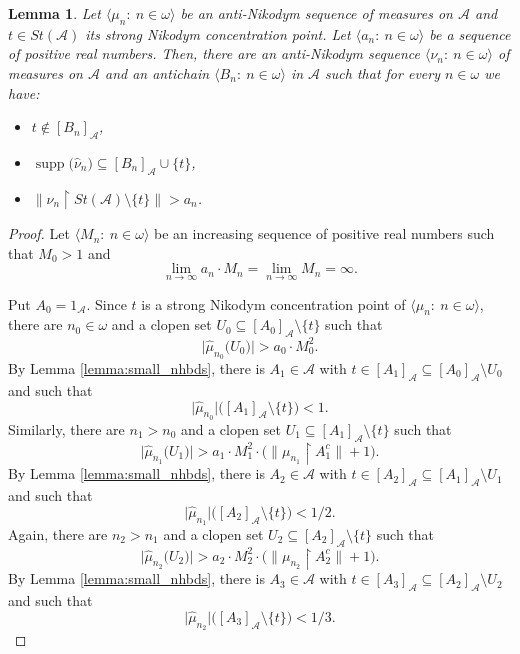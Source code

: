 \documentclass[a4paper,11pt,fleqn]{amsart}
\newtheorem{lemma}[theorem]{Lemma}
\theoremstyle{definition}
\theoremstyle{remark}
\numberwithin{equation}{section}
\newcommand{\N}{\mathbb{N}}
\newcommand{\aA}{\mathcal{A}}
\newcommand{\rstr}{\restriction}
\newcommand{\sm}{\setminus}
\newcommand{\sub}{\subseteq}
\DeclareMathOperator{\supp}{supp}
\newcommand{\wh}{\widehat}
\newcommand{\seqn}[1]{\big\langle#1\colon\ n\io\big\rangle}
\newcommand{\clopen}[1]{\left[#1\right]}
\newcommand{\io}{\in\omega}%
\begin{document}
\begin{lemma}\label{lemma:aN_disjointification}
Let $\seqn{\mu_n}$ be an anti-Nikodym sequence of measures on $\aA$ and $t\in St(\aA)$ its strong Nikodym concentration point. Let $\seqn{a_n}$ be a sequence of positive real numbers. Then, there are an anti-Nikodym sequence $\seqn{\nu_n}$ of measures on $\aA$ and an antichain $\seqn{B_n}$ in $\aA$ such that for every $n\io$ we have:
\begin{itemize}
	\item $t\not\in\clopen{B_n}_\aA$,
	\item $\supp\big(\wh{\nu}_n\big)\sub\clopen{B_n}_\aA\cup\{t\}$,
	\item $\big\|\wh{\nu}_n\rstr St(\aA)\sm\{t\}\big\|>a_n$.
\end{itemize}
\end{lemma}
\begin{proof}
Let $\seqn{M_n}$ be an increasing sequence of positive real numbers such that $M_0>1$ and
\[\tag{$*$}\lim_{n\to\infty}a_n\cdot M_n=\lim_{n\to\infty}M_n=\infty.\]

Put $A_0=1_\aA$. Since $t$ is a strong Nikodym concentration point of $\seqn{\mu_n}$, there are $n_0\io$ and a clopen set $U_0\sub\clopen{A_0}_\aA\sm\{t\}$ such that
\[\big|\wh{\mu}_{n_0}\big(U_0\big)\big|>a_0\cdot M_0^2.\]
By Lemma \ref{lemma:small_nhbds}, there is $A_1\in\aA$ with $t\in\clopen{A_1}_\aA\sub\clopen{A_0}_\aA\sm U_0$ and such that
\[\big|\wh{\mu}_{n_0}\big|\big(\clopen{A_1}_\aA\sm\{t\}\big)<1.\]
Similarly, there are $n_1>n_0$ and a clopen set $U_1\sub\clopen{A_1}_\aA\sm\{t\}$ such that
\[\big|\wh{\mu}_{n_1}\big(U_1\big)\big|>a_1\cdot M_1^2\cdot\Big(\big\|\mu_{n_1}\rstr A_1^c\big\|+1\Big).\]
By Lemma \ref{lemma:small_nhbds}, there is $A_2\in\aA$ with $t\in\clopen{A_2}_\aA\sub\clopen{A_1}_\aA\sm U_1$ and such that
\[\big|\wh{\mu}_{n_1}\big|\big(\clopen{A_2}_\aA\sm\{t\}\big)<1/2.\]
Again, there are $n_2>n_1$ and a clopen set $U_2\sub\clopen{A_2}_\aA\sm\{t\}$ such that
\[\big|\wh{\mu}_{n_2}\big(U_2\big)\big|>a_2\cdot M_2^2\cdot\Big(\big\|\mu_{n_2}\rstr A_2^c\big\|+1\Big).\]
By Lemma \ref{lemma:small_nhbds}, there is $A_3\in\aA$ with $t\in\clopen{A_3}_\aA\sub\clopen{A_2}_\aA\sm U_2$ and such that
\[\big|\wh{\mu}_{n_2}\big|\big(\clopen{A_3}_\aA\sm\{t\}\big)<1/3.\]


\end{proof}
\end{document}
